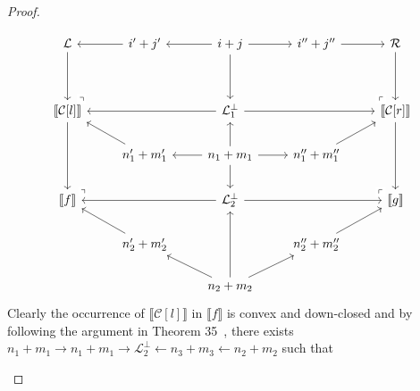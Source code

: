 \begin{proof}
\begin{itemize}
              \[\begin{tikzcd}
                {\mathcal{L}} & {i'+j'} & {i+j} & {i''+j''} & {\mathcal{R}} \\
                \\
                {\llbracket \mathcal{C}[l]\rrbracket} && {\mathcal{L}_1^{\bot}} && {\llbracket \mathcal{C}[r]\rrbracket} \\
                & {n_1'+m_1'} & {n_1+m_1} & {n_1''+m_1''} \\
                {\llbracket f \rrbracket} && {\mathcal{L}_2^{\bot}} && {\llbracket g \rrbracket} \\
                & {n_2' + m_2'} && {n_2''+m_2''} \\
                && {n_2 + m_2}
                \arrow[from=1-1, to=3-1]
                \arrow[from=1-2, to=1-1]
                \arrow[from=1-3, to=1-2]
                \arrow[from=1-3, to=1-4]
                \arrow[from=1-3, to=3-3]
                \arrow[from=1-4, to=1-5]
                \arrow[from=1-5, to=3-5]
                \arrow["\lrcorner"{pos=0.025, rotate=90, description}, draw=none, from=3-1, to=1-2]
                \arrow[from=3-1, to=5-1]
                \arrow[from=3-3, to=3-1]
                \arrow[from=3-3, to=3-5]
                \arrow["\lrcorner"{pos=0.025, rotate=180, description}, draw=none, from=3-5, to=1-4]
                \arrow[from=3-5, to=5-5]
                \arrow[from=4-2, to=3-1]
                \arrow[from=4-3, to=3-3]
                \arrow[from=4-3, to=4-2]
                \arrow[from=4-3, to=4-4]
                \arrow[from=4-3, to=5-3]
                \arrow[from=4-4, to=3-5]
                \arrow["\lrcorner"{pos=0.025, rotate=90, description}, draw=none, from=5-1, to=4-2]
                \arrow[from=5-3, to=5-1]
                \arrow[from=5-3, to=5-5]
                \arrow["\lrcorner"{pos=0.025, rotate=180, description}, draw=none, from=5-5, to=4-4]
                \arrow[from=6-2, to=5-1]
                \arrow[from=6-4, to=5-5]
                \arrow[from=7-3, to=5-3]
                \arrow[from=7-3, to=6-2]
                \arrow[from=7-3, to=6-4]
            \end{tikzcd}\]
            Clearly the occurrence of $\llbracket \mathcal{C}[l] \rrbracket$ in $\llbracket f \rrbracket$ is convex and down-closed and by following the argument in Theorem 35~\cite{bonchi_string_2022-2}, there exists $n_1 + m_1 \xrightarrow{} n_1 + m_1 \xrightarrow{} \mathcal{L}_2^{\bot} \xleftarrow{} n_3 + m_3 \xleftarrow{} n_2 + m_2$ such that
            \ifdefined \ONECOLUMN

\end{itemize}
\end{proof}

